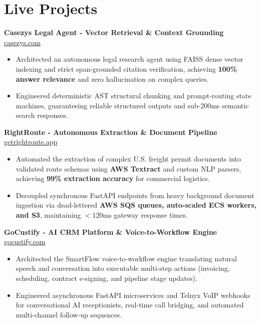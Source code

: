 \documentclass[9.5pt,a4paper]{article}
\begin{document}
\section*{Live Projects}
\noindent
\textbf{Casezys Legal Agent - Vector Retrieval & Context Grounding} \hfill \href{https://casezys.com}{casezys.com}
\begin{itemize}
    \item Architected an autonomous legal research agent using FAISS dense vector indexing and strict span-grounded citation verification, achieving \textbf{100\% answer relevance} and zero hallucination on complex queries.
    \item Engineered deterministic AST structural chunking and prompt-routing state machines, guaranteeing reliable structured outputs and sub-200ms semantic search responses.
\end{itemize}
\vspace{0.6pt}
\noindent
\textbf{RightRoute - Autonomous Extraction & Document Pipeline} \hfill \href{https://getrightroute.app}{getrightroute.app}
\begin{itemize}
    \item Automated the extraction of complex U.S. freight permit documents into validated route schemas using \textbf{AWS Textract} and custom NLP parsers, achieving \textbf{99\% extraction accuracy} for commercial logistics.
    \item Decoupled synchronous FastAPI endpoints from heavy background document ingestion via dead-lettered \textbf{AWS SQS queues, auto-scaled ECS workers, and S3}, maintaining $<$120ms gateway response times.
\end{itemize}
\vspace{0.6pt}
\noindent
\textbf{GoCustify - AI CRM Platform \& Voice-to-Workflow Engine} \hfill \href{https://gocustify.com}{gocustify.com}
\begin{itemize}
    \item Architected the SmartFlow voice-to-workflow engine translating natural speech and conversation into executable multi-step actions (invoicing, scheduling, contract e-signing, and pipeline stage updates).
    \item Engineered asynchronous FastAPI microservices and Telnyx VoIP webhooks for conversational AI receptionists, real-time call bridging, and automated multi-channel follow-up sequences.
\end{itemize}
\vspace{0.6pt}
\end{document}
